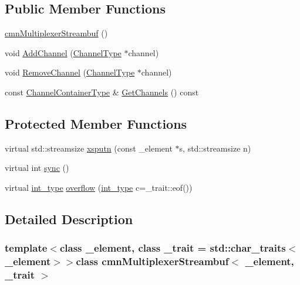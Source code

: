 \subsection*{Public Member Functions}
\begin{DoxyCompactItemize}
\item 
\hyperlink{classcmn_multiplexer_streambuf_a756cefd50738a086f4a5c99c69907f7b}{cmn\+Multiplexer\+Streambuf} ()
\item 
void \hyperlink{classcmn_multiplexer_streambuf_a1e33a4858eb94ed085987ddbcc01a1d0}{Add\+Channel} (\hyperlink{classcmn_multiplexer_streambuf_a7eb353f0b5fed1a2c8707712aac82095}{Channel\+Type} $\ast$channel)
\item 
void \hyperlink{classcmn_multiplexer_streambuf_affd9794b9412295cf157d204fc71cf8e}{Remove\+Channel} (\hyperlink{classcmn_multiplexer_streambuf_a7eb353f0b5fed1a2c8707712aac82095}{Channel\+Type} $\ast$channel)
\item 
const \hyperlink{classcmn_multiplexer_streambuf_a3b414c7f89b55584aef7c8b655bc03ea}{Channel\+Container\+Type} \& \hyperlink{classcmn_multiplexer_streambuf_af2b0f1faceb2ab33e317f2074ca88e15}{Get\+Channels} () const 
\end{DoxyCompactItemize}
\subsection*{Protected Member Functions}
\begin{DoxyCompactItemize}
\item 
virtual std\+::streamsize \hyperlink{classcmn_multiplexer_streambuf_a0e5181e114c169527135d01b28d94169}{xsputn} (const \+\_\+element $\ast$s, std\+::streamsize n)
\item 
virtual int \hyperlink{classcmn_multiplexer_streambuf_a3e1f49548cb968afcdeabe62da5a5ae9}{sync} ()
\item 
virtual \hyperlink{classcmn_multiplexer_streambuf_aaa63d7e4ef3d7ef78dee540971ec88e9}{int\+\_\+type} \hyperlink{classcmn_multiplexer_streambuf_a90999d31356176b52174452e2a43c1ae}{overflow} (\hyperlink{classcmn_multiplexer_streambuf_aaa63d7e4ef3d7ef78dee540971ec88e9}{int\+\_\+type} c=\+\_\+trait\+::eof())
\end{DoxyCompactItemize}


\subsection{Detailed Description}
\subsubsection*{template$<$class \+\_\+element, class \+\_\+trait = std\+::char\+\_\+traits$<$\+\_\+element$>$$>$class cmn\+Multiplexer\+Streambuf$<$ \+\_\+element, \+\_\+trait $>$}

